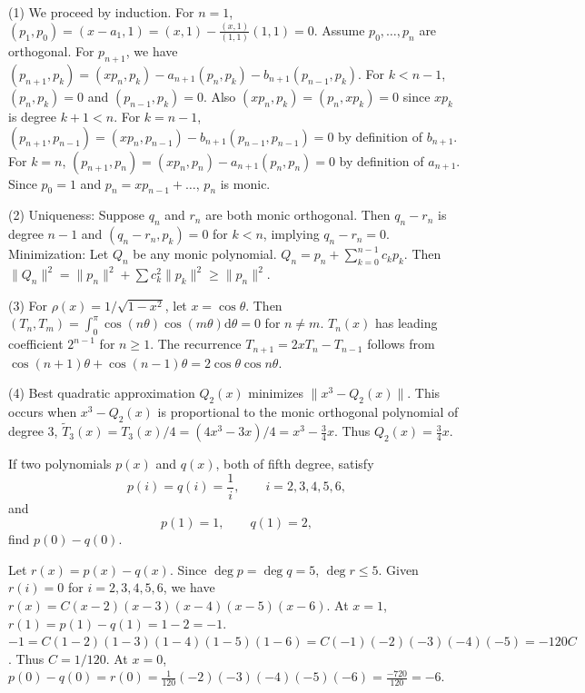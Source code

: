 \begin{solution}
(1) We proceed by induction. For $n=1$, $(p_1, p_0) = (x-a_1, 1) = (x, 1) - \frac{(x, 1)}{(1, 1)}(1, 1) = 0$. Assume $p_0, \dots, p_n$ are orthogonal. For $p_{n+1}$, we have $(p_{n+1}, p_k) = (x p_n, p_k) - a_{n+1}(p_n, p_k) - b_{n+1}(p_{n-1}, p_k)$.
For $k < n-1$, $(p_n, p_k) = 0$ and $(p_{n-1}, p_k) = 0$. Also $(x p_n, p_k) = (p_n, x p_k) = 0$ since $x p_k$ is degree $k+1 < n$.
For $k = n-1$, $(p_{n+1}, p_{n-1}) = (x p_n, p_{n-1}) - b_{n+1}(p_{n-1}, p_{n-1}) = 0$ by definition of $b_{n+1}$.
For $k = n$, $(p_{n+1}, p_n) = (x p_n, p_n) - a_{n+1}(p_n, p_n) = 0$ by definition of $a_{n+1}$.
Since $p_0=1$ and $p_n = x p_{n-1} + \dots$, $p_n$ is monic.

(2) Uniqueness: Suppose $q_n$ and $r_n$ are both monic orthogonal. Then $q_n - r_n$ is degree $n-1$ and $(q_n - r_n, p_k) = 0$ for $k < n$, implying $q_n - r_n = 0$.
Minimization: Let $Q_n$ be any monic polynomial. $Q_n = p_n + \sum_{k=0}^{n-1} c_k p_k$. Then $\|Q_n\|^2 = \|p_n\|^2 + \sum c_k^2 \|p_k\|^2 \ge \|p_n\|^2$.

(3) For $\rho(x) = 1/\sqrt{1-x^2}$, let $x = \cos \theta$. Then $(T_n, T_m) = \int_0^\pi \cos(n\theta) \cos(m\theta) \mathrm{d}\theta = 0$ for $n \neq m$. $T_n(x)$ has leading coefficient $2^{n-1}$ for $n \ge 1$. The recurrence $T_{n+1} = 2x T_n - T_{n-1}$ follows from $\cos(n+1)\theta + \cos(n-1)\theta = 2 \cos \theta \cos n\theta$.

(4) Best quadratic approximation $Q_2(x)$ minimizes $\|x^3 - Q_2(x)\|$. This occurs when $x^3 - Q_2(x)$ is proportional to the monic orthogonal polynomial of degree 3, $\tilde{T}_3(x) = T_3(x)/4 = (4x^3 - 3x)/4 = x^3 - \frac{3}{4}x$. Thus $Q_2(x) = \frac{3}{4}x$.
\end{solution}

\begin{exercise}
\label{applied:2011:2}
If two polynomials $p ( x )$ and $q ( x )$, both of fifth degree, satisfy
\[
p (i) = q (i) = \frac {1}{i}, \qquad i = 2, 3, 4, 5, 6,
\]
and
\[
p (1) = 1, \qquad q (1) = 2,
\]
find $p ( 0 ) - q ( 0 )$.
\end{exercise}

\begin{solution}
Let $r(x) = p(x) - q(x)$. Since $\deg p = \deg q = 5$, $\deg r \le 5$.
Given $r(i) = 0$ for $i=2,3,4,5,6$, we have $r(x) = C(x-2)(x-3)(x-4)(x-5)(x-6)$.
At $x=1$, $r(1) = p(1) - q(1) = 1 - 2 = -1$.
$-1 = C(1-2)(1-3)(1-4)(1-5)(1-6) = C(-1)(-2)(-3)(-4)(-5) = -120C$.
Thus $C = 1/120$.
At $x=0$, $p(0) - q(0) = r(0) = \frac{1}{120} (-2)(-3)(-4)(-5)(-6) = \frac{-720}{120} = -6$.
\end{solution}

